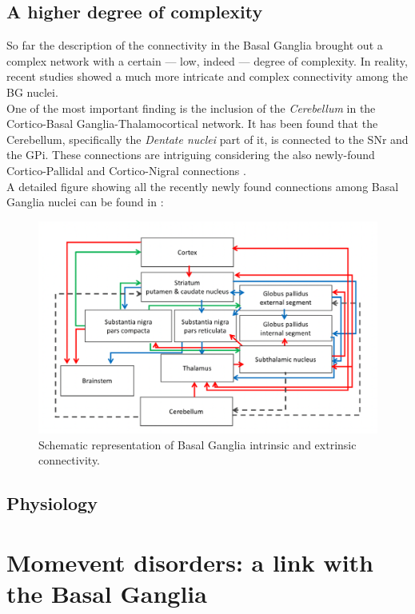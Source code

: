 \documentclass[MSc,english]{Container/thesistemplate}
\begin{document}
\newpage
\subsection*{A higher degree of complexity}
So far the description of the connectivity in the Basal Ganglia brought out a complex network with a certain --- low, indeed --- degree of complexity. In reality, recent studies showed a much more intricate and complex connectivity among the BG nuclei. 
\\ One of the most important finding is the inclusion of the \emph{Cerebellum} in the Cortico-Basal Ganglia-Thalamocortical network. It has been found that the Cerebellum, specifically the \emph{Dentate nuclei} part of it, is connected to the SNr and the GPi. These connections are intriguing considering the also newly-found Cortico-Pallidal and Cortico-Nigral connections \cite{milardi}.
\\ A detailed figure showing all the recently newly found connections among Basal Ganglia nuclei can be found in \cite{simonyan}:

\begin{figure}[ht!]
    \centering
    \includegraphics[scale=.8]{Images/network}
    \caption{Schematic representation of Basal Ganglia intrinsic and extrinsic connectivity.}
    \label{fig:network}
\end{figure}


\newpage
\subsection{Physiology}


\newpage
\section{Momevent disorders: a link with the Basal Ganglia}
\end{document}
